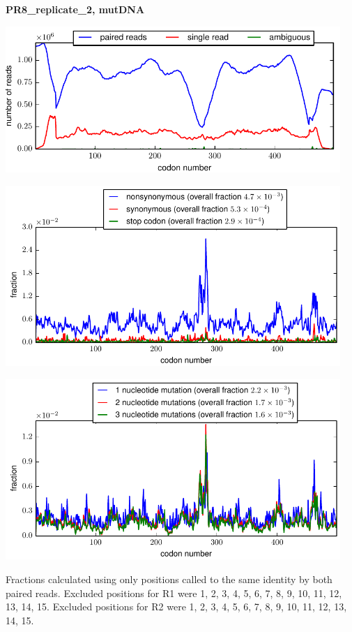 \documentclass[10pt,letterpaper]{article}
\begin{document}
\centerline{\Large \bf PR8\_replicate\_2, mutDNA}
\vspace{0.1in}

\centerline{\includegraphics[width=5in]{PR8_replicate_2_mutDNA_codondepth.pdf}}
\vspace{0.1in}

\centerline{\includegraphics[width=5in]{PR8_replicate_2_mutDNA_syn-ns-dist.pdf}}
\vspace{0.1in}

\centerline{\includegraphics[width=5in]{PR8_replicate_2_mutDNA_nmutspercodon-dist.pdf}}
\vspace{0.1in}

Fractions calculated using only positions called to the same identity by both paired reads.  Excluded positions for R1 were 1, 2, 3, 4, 5, 6, 7, 8, 9, 10, 11, 12, 13, 14, 15. 
 Excluded positions for R2 were 1, 2, 3, 4, 5, 6, 7, 8, 9, 10, 11, 12, 13, 14, 15. 
\end{document}
